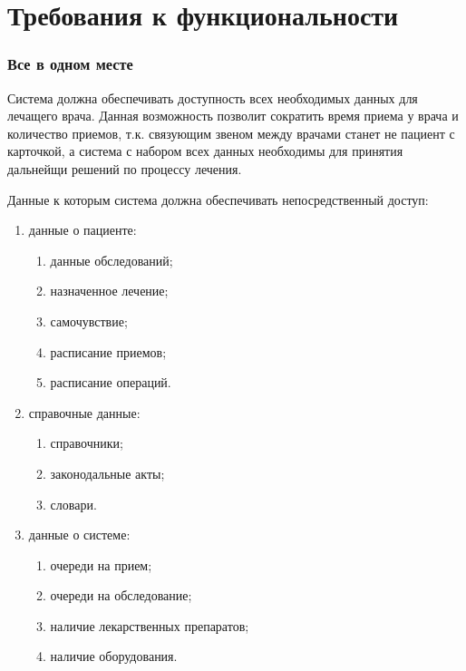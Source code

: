\section{Требования к функциональности}
\subsubsection{Все в одном месте}
Система должна обеспечивать доступность всех необходимых данных для лечащего врача. Данная возможность позволит сократить время приема у врача и количество приемов, т.к. связующим звеном между врачами станет не пациент с карточкой, а система с набором всех данных необходимы для принятия дальнейщи решений по процессу лечения.

Данные к которым система должна обеспечивать непосредственный доступ:

\begin{enumerate}
  \item данные о пациенте:
  \begin{enumerate}
    \item данные обследований;
    \item назначенное лечение;
    \item самочувствие;
    \item расписание приемов;
    \item расписание операций.
  \end{enumerate}
  \item справочные данные:
  \begin{enumerate}
    \item справочники;
    \item законодальные акты;
    \item словари.
  \end{enumerate}
  \item данные о системе:
  \begin{enumerate}
    \item очереди на прием;
    \item очереди на обследование;
    \item наличие лекарственных препаратов;
    \item наличие оборудования.
  \end{enumerate}     
\end{enumerate}




